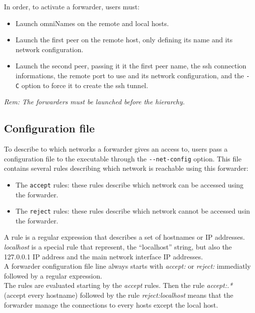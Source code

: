 \noindent In order, to activate a \diet forwarder, users must:
\begin{itemize}
\item Launch omniNames on the remote and local hosts.
\item Launch the first peer on the remote host, only defining its name
  and its network configuration.
\item Launch the second peer, passing it it the first peer name, the
  ssh connection informations, the remote port to use and its network
  configuration, and the \verb#-C# option to force it to create the
  ssh tunnel.
\end{itemize}

\noindent\textit{Rem: The forwarders must be launched before the \diet
  hierarchy.}


\subsection{Configuration file}
To describe to which networks a forwarder gives an access to, users pass a
configuration file to the executable through the \verb#--net-config#
option. This file contains several rules describing which network is
reachable using this forwarder:
\begin{itemize}
\item The \verb#accept# rules: these rules describe which network can
  be accessed using the forwarder.
\item The \verb#reject# rules: these rules describe which network
  cannot be accessed usin the forwarder.\\
\end{itemize}

A rule is a regular expression that describes a set of hostnames or IP
addresses. \textit{localhost} is a special rule that represent, the
``localhost'' string, but also the 127.0.0.1 IP address and the main
network interface IP addresses.\\

A \diet forwarder configuration file line always starts with
\textit{accept:} or \textit{reject:} immediatly followed by a regular
expression.\\

The rules are evaluated starting by the \textit{accept} rules. Then
the rule \textit{accept:.*} (accept every hostname) followed by the
rule \textit{reject:localhost} means that the forwarder manage the
connections to every hosts except the local host.

